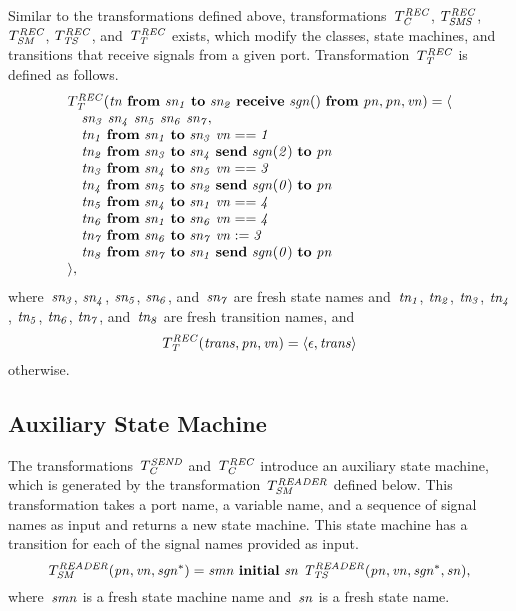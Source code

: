 
Similar to the transformations defined above, transformations~$T_{\it{C}}^{\it{REC}}$, $T_{\it{SMS}}^{\it{REC}}$, $T_{\it{SM}}^{\it{REC}}$, $T_{\it{TS}}^{\it{REC}}$, and~$T_{\it{T}}^{\it{REC}}$ exists, which modify the classes, state machines, and transitions that receive signals from a given port.
Transformation~$T_{\it{T}}^{\it{REC}}$ is defined as follows.
%
\[
\begin{array}{l}
T_{\it{T}}^{\it{REC}}(\it{tn}~\textbf{from}~\it{sn_1}~\textbf{to}~\it{sn_2}~\textbf{receive}~\it{sgn}()~\textbf{from}~\it{pn}, \it{pn}, \it{vn}) = \langle \\
\quad \it{sn_3}~\it{sn_4}~\it{sn_5}~\it{sn_6}~\it{sn_7}, \\
\quad \it{tn_1}~\textbf{from}~\it{sn_1}~\textbf{to}~\it{sn_3}~\it{vn}==1 \\
\quad \it{tn_2}~\textbf{from}~\it{sn_3}~\textbf{to}~\it{sn_4}~\textbf{send}~\it{sgn}(2)~\textbf{to}~\it{pn} \\
\quad \it{tn_3}~\textbf{from}~\it{sn_4}~\textbf{to}~\it{sn_5}~\it{vn}==3 \\
\quad \it{tn_4}~\textbf{from}~\it{sn_5}~\textbf{to}~\it{sn_2}~\textbf{send}~\it{sgn}(0)~\textbf{to}~\it{pn} \\
\quad \it{tn_5}~\textbf{from}~\it{sn_4}~\textbf{to}~\it{sn_1}~\it{vn}==4 \\
\quad \it{tn_6}~\textbf{from}~\it{sn_1}~\textbf{to}~\it{sn_6}~\it{vn}==4 \\
\quad \it{tn_7}~\textbf{from}~\it{sn_6}~\textbf{to}~\it{sn_7}~\it{vn}:=3 \\
\quad \it{tn_8}~\textbf{from}~\it{sn_7}~\textbf{to}~\it{sn_1}~\textbf{send}~\it{sgn}(0)~\textbf{to}~\it{pn} \\
\rangle,
\end{array}
\]
where~$\it{sn_3}$, $\it{sn_4}$, $\it{sn_5}$, $\it{sn_6}$, and~$\it{sn_7}$ are fresh state names and~$\it{tn_1}$, $\it{tn_2}$, $\it{tn_3}$, $\it{tn_4}$, $\it{tn_5}$, $\it{tn_6}$, $\it{tn_7}$, and~$\it{tn_8}$ are fresh transition names, and
%
\[
T_{\it{T}}^{\it{REC}}(\it{trans}, \it{pn}, \it{vn}) = \langle \epsilon, \it{trans} \rangle
\]
otherwise.

\subsection{Auxiliary State Machine}
The transformations~$T_{\it{C}}^{\it{SEND}}$ and~$T_{\it{C}}^{\it{REC}}$ introduce an auxiliary state machine, which is generated by the transformation~$T_{\it{SM}}^{\it{READER}}$ defined below.
This transformation takes a port name, a variable name, and a sequence of signal names as input and returns a new state machine.
This state machine has a transition for each of the signal names provided as input.
%
\[
T_{\it{SM}}^{\it{READER}}(\it{pn}, \it{vn}, \it{sgn^*}) =
\it{smn}
~ \textbf{initial}~\it{sn}
~ T_{\it{TS}}^{\it{READER}}(\it{pn}, \it{vn}, \it{sgn^*}, \it{sn}),
\]
where~$\it{smn}$ is a fresh state machine name and~$\it{sn}$ is a fresh state name.

